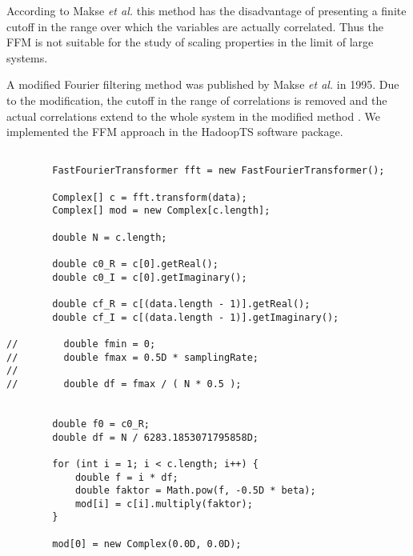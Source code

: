 \documentclass[a4paper,10pt]{scrbook}
\begin{document}
According to Makse \textit{et al.} \cite{Makse1995} this method has the disadvantage of
presenting a finite cutoff in the range over which the variables
are actually correlated. Thus the FFM is not suitable for the study of scaling properties in the limit of
large systems.

A modified Fourier filtering method was published by Makse \textit{et al.} in 1995. Due to the modification, the cutoff in
the range of correlations is removed and the actual correlations extend to the whole system in the modified method \cite{Makse1995}. We implemented the FFM approach in the HadoopTS software package. 





\begin{lstlisting}

        FastFourierTransformer fft = new FastFourierTransformer();

        Complex[] c = fft.transform(data);
        Complex[] mod = new Complex[c.length];

        double N = c.length;

        double c0_R = c[0].getReal();
        double c0_I = c[0].getImaginary();

        double cf_R = c[(data.length - 1)].getReal();
        double cf_I = c[(data.length - 1)].getImaginary();

//        double fmin = 0;
//        double fmax = 0.5D * samplingRate;
//
//        double df = fmax / ( N * 0.5 );
        
        
        double f0 = c0_R;
        double df = N / 6283.1853071795858D;
        
        for (int i = 1; i < c.length; i++) {
            double f = i * df;
            double faktor = Math.pow(f, -0.5D * beta);
            mod[i] = c[i].multiply(faktor);
        }

        mod[0] = new Complex(0.0D, 0.0D);
        
    \end{lstlisting}
\end{document}
